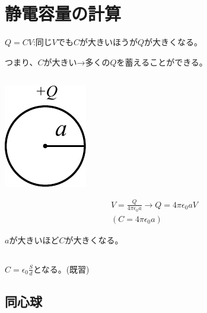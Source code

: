 \documentclass[12pt,fleqn]{ltjsarticle}
\begin{document}
\newcommand{\red}[1]{\textcolor{red}{#1}}
\renewcommand{\labelenumi}{(\arabic{enumi})}

\section{静電容量の計算}
$Q=CV$:同じ$V$でも$C$が大きいほうが$Q$が大きくなる。

つまり、$C$が大きい→多くの$Q$を蓄えることができる。

\subsection{}

\begin{minipage}{.2\linewidth}
\includegraphics{14-1.pdf}
\end{minipage}
\hfill
\begin{minipage}{.8\linewidth}
\begin{align*}
V=\frac{Q}{4\pi \epsilon_0a}\rightarrow Q=4\pi\epsilon_0aV\\
(C=4\pi\epsilon_0a)
\end{align*}

$a$が大きいほど$C$が大きくなる。
\end{minipage}

\subsection{}

$C=\epsilon_0 \frac Sd$となる。(既習)

\subsection{同心球}
\end{document}
